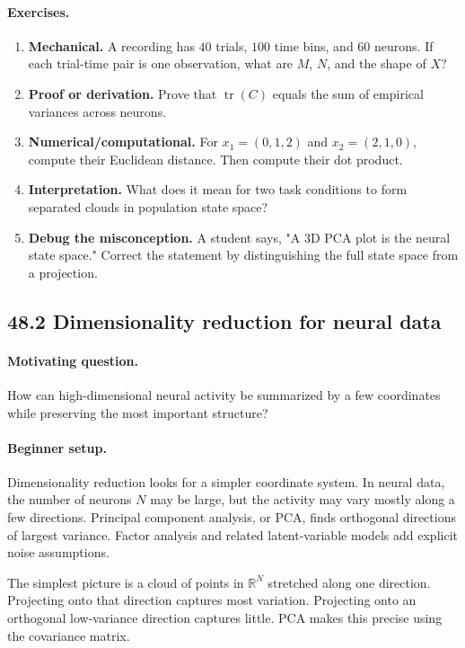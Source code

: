 \paragraph{Exercises.}
\begin{enumerate}[label=\textbf{48.1.\arabic*.}, leftmargin=*]
\item \textbf{Mechanical.} A recording has \(40\) trials, \(100\) time bins, and \(60\) neurons. If each trial-time pair is one observation, what are \(M\), \(N\), and the shape of \(X\)?
\item \textbf{Proof or derivation.} Prove that \(\operatorname{tr}(C)\) equals the sum of empirical variances across neurons.
\item \textbf{Numerical/computational.} For \(x_1=(0,1,2)\) and \(x_2=(2,1,0)\), compute their Euclidean distance. Then compute their dot product.
\item \textbf{Interpretation.} What does it mean for two task conditions to form separated clouds in population state space?
\item \textbf{Debug the misconception.} A student says, "A 3D PCA plot is the neural state space." Correct the statement by distinguishing the full state space from a projection.
\end{enumerate}

\subsection{48.2 Dimensionality reduction for neural data}

\paragraph{Motivating question.}
How can high-dimensional neural activity be summarized by a few coordinates while preserving the most important structure?

\paragraph{Beginner setup.}
Dimensionality reduction looks for a simpler coordinate system. In neural data, the number of neurons \(N\) may be large, but the activity may vary mostly along a few directions. Principal component analysis, or PCA, finds orthogonal directions of largest variance. Factor analysis and related latent-variable models add explicit noise assumptions.

The simplest picture is a cloud of points in \(\mathbb R^N\) stretched along one direction. Projecting onto that direction captures most variation. Projecting onto an orthogonal low-variance direction captures little. PCA makes this precise using the covariance matrix.


